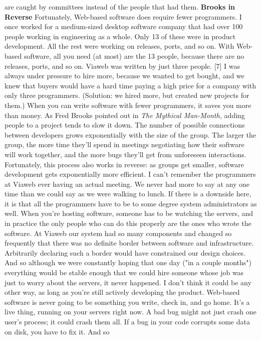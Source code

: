 are caught by committees instead of the people that had them.
\textbf{Brooks in Reverse}
Fortunately, Web-based software does require fewer programmers.
I once worked for a medium-sized desktop software company that had
over 100 people working in engineering as a whole.  Only 13 of
these were in product development.  All the rest were working on
releases, ports, and so on.  With Web-based software, all you need
(at most) are the 13 people, because there are no releases, ports,
and so on.
Viaweb was written by just three people. [7]  I was always under
pressure to hire more, because we wanted to get bought, and we knew
that buyers would have a hard time paying a high price for a company
with only three programmers.  (Solution:  we hired more, but created
new projects for them.)
When you can write software with fewer programmers, it saves you
more than money.  As Fred Brooks pointed out in \emph{The Mythical
Man-Month,} adding people to a project tends to slow it down.  The
number of possible connections between developers grows exponentially
with the size of the group.  The larger the group, the more time
they'll spend in meetings negotiating how their software will work
together, and the more bugs they'll get from unforeseen interactions.
Fortunately, this process also works in reverse: as groups get
smaller, software development gets exponentially more efficient.
I can't remember the programmers at Viaweb ever having an actual
meeting.  We never had more to say at any one time than we could
say as we were walking to lunch.
If there is a downside here, it is that all the programmers have
to be to some degree system administrators as well.  When you're
hosting software, someone has to be watching the servers, and in
practice the only people who can do this properly are the ones who
wrote the software.  At Viaweb our system had so many components
and changed so frequently that there was no definite border between
software and infrastructure.  Arbitrarily declaring such a border
would have constrained our design choices.  And so although we were
constantly hoping that one day ("in a couple months") everything
would be stable enough that we could hire someone whose job was
just to worry about the servers, it never happened.
I don't think it could be any other way, as long as you're still
actively developing the product.  Web-based software is never going
to be something you write, check in, and go home.  It's a live
thing, running on your servers right now.  A bad bug might not just
crash one user's process; it could crash them all.  If a bug in
your code corrupts some data on disk, you have to fix it.  And so
